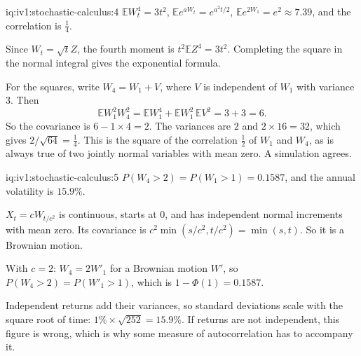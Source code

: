 \begin{solution}{iq:iv1:stochastic-calculus:4}
$\mathbb{E}W_t^4 = 3t^2$, $\mathbb{E}e^{aW_t} = e^{a^2t/2}$, $\mathbb{E}e^{2W_1} = e^2 \approx 7.39$, and the correlation is $\frac14$.

Since $W_t = \sqrt{t}Z$, the fourth moment is $t^2\mathbb{E}Z^4 = 3t^2$. Completing the square in the normal integral gives the exponential formula.

For the squares, write $W_4 = W_1 + V$, where $V$ is independent of $W_1$ with variance 3. Then
\[
\mathbb{E}W_1^2W_4^2 = \mathbb{E}W_1^4 + \mathbb{E}W_1^2\,\mathbb{E}V^2 = 3 + 3 = 6.
\]
So the covariance is $6 - 1 \times 4 = 2$. The variances are $2$ and $2 \times 16 = 32$, which gives $2/\sqrt{64} = \frac14$. This is the square of the correlation $\frac12$ of $W_1$ and $W_4$, as is always true of two jointly normal variables with mean zero. A simulation agrees.



\end{solution}

\enlargethispage{-3\baselineskip}%
\begin{solution}{iq:iv1:stochastic-calculus:5}
$P(W_4 > 2) = P(W_1 > 1) = 0.1587$, and the annual volatility is $15.9\%$.

$X_t = cW_{t/c^2}$ is continuous, starts at 0, and has independent normal increments with mean zero. Its covariance is $c^2\min(s/c^2, t/c^2) = \min(s, t)$. So it is a Brownian motion.

With $c = 2$: $W_4 = 2W'_1$ for a Brownian motion $W'$, so $P(W_4 > 2) = P(W'_1 > 1)$, which is $1 - \Phi(1) = 0.1587$.

Independent returns add their variances, so standard deviations scale with the square root of time: $1\% \times \sqrt{252} = 15.9\%$. If returns are not independent, this figure is wrong, which is why some measure of autocorrelation has to accompany it.



\end{solution}

